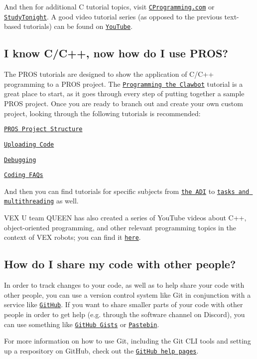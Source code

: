 And then for additional C tutorial topics, visit \href{https://www.cprogramming.com/tutorial/c-tutorial.html}{\tt C\+Programming.\+com} or \href{http://www.studytonight.com/c/overview-of-c.php}{\tt Study\+Tonight}. A good video tutorial series (as opposed to the previous text-\/based tutorials) can be found on \href{https://youtu.be/nXvy5900m3M}{\tt You\+Tube}.

\subsection*{I know C/\+C++, now how do I use P\+R\+OS?}

The P\+R\+OS tutorials are designed to show the application of C/\+C++ programming to a P\+R\+OS project. The \href{../tutorials/walkthrough/clawbot.html}{\tt Programming the Clawbot} tutorial is a great place to start, as it goes through every step of putting together a sample P\+R\+OS project. Once you are ready to branch out and create your own custom project, looking through the following tutorials is recommended\+:


\begin{DoxyItemize}
\item \href{../tutorials/general/project-structure.html}{\tt P\+R\+OS Project Structure}
\item \href{../tutorials/walkthrough/uploading.html}{\tt Uploading Code}
\item \href{../tutorials/general/debugging.html}{\tt Debugging}
\item \href{./faq.html}{\tt Coding F\+A\+Qs}
\end{DoxyItemize}

And then you can find tutorials for specific subjects from \href{../tutorials/topical/adi.html}{\tt the A\+DI} to \href{../tutorials/topical/multitasking.html}{\tt tasks and multithreading} as well.

V\+EX U team Q\+U\+E\+EN has also created a series of You\+Tube videos about C++, object-\/oriented programming, and other relevant programming topics in the context of V\+EX robots; you can find it \href{https://www.youtube.com/playlist?list=PLxt0dHFRDpQhy24IL1wAniVq3xf8N7QAV}{\tt here}.

\subsection*{How do I share my code with other people?}

In order to track changes to your code, as well as to help share your code with other people, you can use a version control system like Git in conjunction with a service like \href{https://github.com}{\tt Git\+Hub}. If you want to share smaller parts of your code with other people in order to get help (e.\+g. through the software channel on Discord), you can use something like \href{https://gist.github.com}{\tt Git\+Hub Gists} or \href{https://pastebin.com}{\tt Pastebin}.

For more information on how to use Git, including the Git C\+LI tools and setting up a respository on Git\+Hub, check out the \href{https://help.github.com}{\tt Git\+Hub help pages}. 